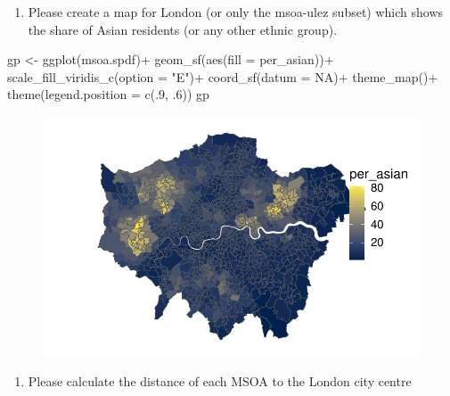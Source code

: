 \documentclass[
  letterpaper,
]{scrbook}
\newenvironment{Shaded}{\begin{snugshade}}{\end{snugshade}}
\newcommand{\AttributeTok}[1]{\textcolor[rgb]{0.40,0.45,0.13}{#1}}
\newcommand{\ConstantTok}[1]{\textcolor[rgb]{0.56,0.35,0.01}{#1}}
\newcommand{\DecValTok}[1]{\textcolor[rgb]{0.68,0.00,0.00}{#1}}
\newcommand{\FunctionTok}[1]{\textcolor[rgb]{0.28,0.35,0.67}{#1}}
\newcommand{\NormalTok}[1]{\textcolor[rgb]{0.00,0.23,0.31}{#1}}
\newcommand{\OtherTok}[1]{\textcolor[rgb]{0.00,0.23,0.31}{#1}}
\newcommand{\SpecialCharTok}[1]{\textcolor[rgb]{0.37,0.37,0.37}{#1}}
\newcommand{\StringTok}[1]{\textcolor[rgb]{0.13,0.47,0.30}{#1}}
\providecommand{\tightlist}{%
  \setlength{\itemsep}{0pt}\setlength{\parskip}{0pt}}\usepackage{longtable,booktabs,array}
\begin{document}
\begin{enumerate}
\def\labelenumi{\arabic{enumi})}
\setcounter{enumi}{2}
\tightlist
\item
  Please create a map for London (or only the msoa-ulez subset) which
  shows the share of Asian residents (or any other ethnic group).
\end{enumerate}

\begin{Shaded}
\begin{Highlighting}[]
\NormalTok{gp }\OtherTok{\textless{}{-}} \FunctionTok{ggplot}\NormalTok{(msoa.spdf)}\SpecialCharTok{+}
    \FunctionTok{geom\_sf}\NormalTok{(}\FunctionTok{aes}\NormalTok{(}\AttributeTok{fill =}\NormalTok{ per\_asian))}\SpecialCharTok{+}
    \FunctionTok{scale\_fill\_viridis\_c}\NormalTok{(}\AttributeTok{option =} \StringTok{"E"}\NormalTok{)}\SpecialCharTok{+}
    \FunctionTok{coord\_sf}\NormalTok{(}\AttributeTok{datum =} \ConstantTok{NA}\NormalTok{)}\SpecialCharTok{+}
    \FunctionTok{theme\_map}\NormalTok{()}\SpecialCharTok{+}
    \FunctionTok{theme}\NormalTok{(}\AttributeTok{legend.position =} \FunctionTok{c}\NormalTok{(.}\DecValTok{9}\NormalTok{, .}\DecValTok{6}\NormalTok{))}
\NormalTok{gp}
\end{Highlighting}
\end{Shaded}

\begin{figure}[H]

{\centering \includegraphics{02_spatial-data_files/figure-pdf/unnamed-chunk-25-1.pdf}

}

\end{figure}

\begin{enumerate}
\def\labelenumi{\arabic{enumi})}
\setcounter{enumi}{3}
\tightlist
\item
  Please calculate the distance of each MSOA to the London city centre
\end{enumerate}
\end{document}
